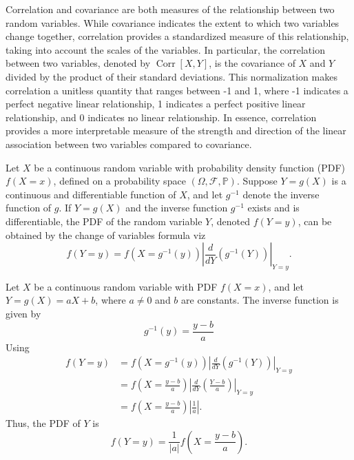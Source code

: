 Correlation and covariance are both measures of the relationship between two random variables. While covariance indicates the extent to which two variables change together, correlation provides a standardized measure of this relationship, taking into account the scales of the variables. In particular, the correlation between two variables, denoted by $\operatorname{Corr}[X, Y]$, is the covariance of $X$ and $Y$ divided by the product of their standard deviations. This normalization makes correlation a unitless quantity that ranges between -1 and 1, where -1 indicates a perfect negative linear relationship, 1 indicates a perfect positive linear relationship, and 0 indicates no linear relationship. In essence, correlation provides a more interpretable measure of the strength and direction of the linear association between two variables compared to covariance.

\begin{definition}
	\label{def:change_of_variables}
	Let $X$ be a continuous random variable with probability density function (PDF) $f(X =x)$, defined on a probability space $(\Omega, \mathcal{F},\mathbb{P})$. Suppose $Y = g(X)$ is a continuous and differentiable function of $X$, and let $g^{-1}$ denote the inverse function of $g$. If $Y = g(X)$ and the inverse function $g^{-1}$ exists and is differentiable, the PDF of the random variable $Y$, denoted $f(Y=y)$, can be obtained by the change of variables formula viz~\cite{Sivia2006}
	\begin{equation}
		f(Y = y) = f(X = g^{-1}(y)) \left| \frac{d}{d Y} \left( g^{-1}(Y) \right) \right|_{Y=y}.
		\label{eq:change_of_variables}
	\end{equation}
\end{definition}

\begin{example}
	Let $X$ be a continuous random variable with PDF $f(X =x)$, and let $Y = g(X) = aX + b$, where $a \neq 0$ and $b$ are constants. The inverse function is given by
	\begin{equation}
		g^{-1}(y) = \frac{y - b}{a}
	\end{equation}
	Using 
	\begin{equation}
		\begin{split}
			f(Y=y) &= f\left( X = g^{-1}(y) \right) \left| \frac{d}{d Y} \left( g^{-1}(Y) \right) \right|_{Y=y} \\
			&= f\left(X =  \frac{y - b}{a} \right) \left| \frac{d}{d Y} \left( \frac{Y - b}{a} \right) \right|_{Y=y} \\
			&= f\left(X = \frac{y - b}{a} \right) \left| \frac{1}{a} \right|.
		\end{split}
	\end{equation}
	Thus, the PDF of $Y$ is
	\begin{equation}
		f(Y= y) = \frac{1}{|a|} f\left(X =  \frac{y - b}{a} \right).
	\end{equation}
\end{example}

